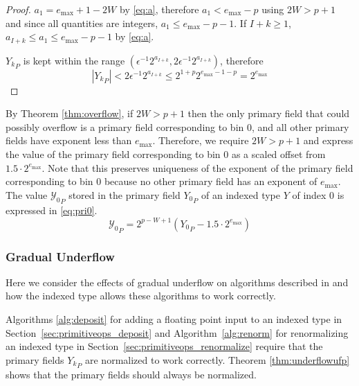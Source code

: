       \begin{proof}
        $a_1 = e_{\max} + 1 - 2 W$ by \eqref{eq:a}, therefore $a_1 < e_{\max} - p$ using $2W > p+1$ and since all quantities are integers, $a_1 \leq e_{\max} - p - 1$. If $I + k \geq 1$, $a_{I + k} \leq a_1 \leq e_{\max} - p - 1$ by \eqref{eq:a}.

        ${Y_k}_P$ is kept within the range $(\epsilon^{-1} 2^{a_{I + k}}, 2 \epsilon^{-1} 2^{a_{I + k}})$, therefore
        \begin{equation*}
          |{Y_k}_P| < 2 \epsilon^{-1} 2^{a_{I + k}} \leq 2^{1 + p} 2^{e_{\max} - 1 - p} = 2^{e_{\max}}
        \end{equation*}
      \end{proof}
      By Theorem \ref{thm:overflow}, if $2 W > p + 1$ then the only primary
      field that could possibly overflow is a primary field corresponding to
      bin 0, and all other primary fields have exponent less than $e_{\max}$.
      Therefore, we require $2 W > p + 1$ and express the value of the primary
      field corresponding to bin 0 as a scaled offset from
      $1.5\cdot2^{e_{\max}}$. Note that this preserves uniqueness of the
      exponent of the primary field corresponding to bin 0 because no other
      primary field has an exponent of $e_{\max}$. The value
      ${\mathcal{Y}_0}_P$ stored in the primary field ${Y_0}_P$ of an indexed
      type $Y$ of index 0 is expressed in \eqref{eq:pri0}.
      \begin{equation}
        {\mathcal{Y}_0}_P = 2^{p - W + 1}({Y_0}_P - 1.5\cdot2^{e_{\max}})
        \label{eq:pri0}
      \end{equation}
    \subsubsection{Gradual Underflow}
      \label{sec:indexed_underflow_gradual}
      Here we consider the effects of gradual underflow on algorithms described
      in \cite{repsum} and how the indexed type allows these algorithms to work
      correctly.

    \label{sec:primitiveops_deposit}
      Algorithms \ref{alg:deposit} for adding a floating point input to an
      indexed type in Section~\ref{sec:primitiveops_deposit} and
      Algorithm~\ref{alg:renorm} for renormalizing an indexed type in
      Section~\ref{sec:primitiveops_renormalize} require that the primary
      fields ${Y_k}_P$ are normalized to work correctly. Theorem
      \ref{thm:underflowufp} shows that the primary fields should always be
      normalized.

